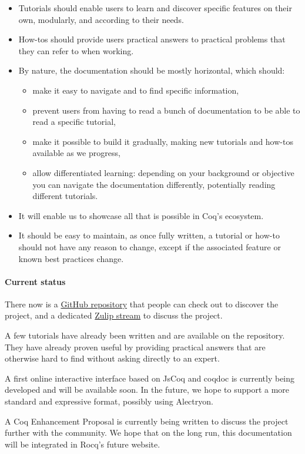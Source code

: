\documentclass{easychair}
\begin{document}
\begin{itemize}[itemsep=0pt]
  \item Tutorials should enable users to learn and discover specific features on
        their own, modularly, and according to their needs.
  \item How-tos should provide users practical answers to practical problems
        that they can refer to when working.
  \item By nature, the documentation should be mostly horizontal, which should:
    \begin{itemize}[itemsep=0pt]
      \item make it easy to navigate and to find specific information,
      \item prevent users from having to read a bunch of documentation to be
	    able to read a specific tutorial,
      \item make it possible to build it gradually, making new tutorials and
	    how-tos available as we progress,
      \item allow differentiated learning: depending on your background or
            objective you can navigate the documentation differently,
            potentially reading different tutorials.
    \end{itemize}
  \item It will enable us to showcase all that is possible in Coq's ecosystem.
  \item It should be easy to maintain, as once fully written, a tutorial or how-to
        should not have any reason to change, except if the associated feature or
        known best practices change.
\end{itemize}

\paragraph{Current status}

There now is a \href{https://github.com/Zimmi48/platform-docs}{GitHub repository}
that people can check out to discover the project, and a dedicated
\href{https://coq.zulipchat.com/#narrow/stream/437203-Platform-docs}{Zulip stream}
to discuss the project.

A few tutorials have already been written and are available on the repository.
They have already proven useful by providing practical answers that are
otherwise hard to find without asking directly to an expert.

A first online interactive interface based on JsCoq and coqdoc is currently
being developed and will be available soon.
In the future, we hope to support a more standard and expressive format,
possibly using Alectryon.

A Coq Enhancement Proposal is currently being written to discuss the
project further with the community.
We hope that on the long run, this documentation will be integrated in Rocq's
future website.

\label{sect:bib}


\end{document}
